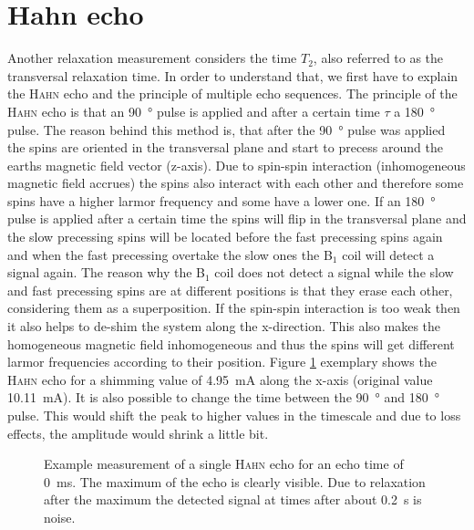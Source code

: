 \section{Hahn echo}
\label{sec:Hahnecho}
Another relaxation measurement considers the time $T_2$, also referred to as the transversal relaxation time.
In order to understand that, we first have to explain the \textsc{Hahn} echo and the principle of multiple echo sequences.\newline
The principle of the \textsc{Hahn} echo is that an \SI{90}{\degree} pulse is applied and after a certain time $\tau$ a \SI{180}{\degree} pulse.
The reason behind this method is, that after the \SI{90}{\degree} pulse was applied the spins are oriented in the transversal plane and start to precess around the earths magnetic field vector (z-axis).
Due to spin-spin interaction (inhomogeneous magnetic field accrues) the spins also interact with each other and therefore some spins have a higher larmor frequency and some have a lower one.
If an \SI{180}{\degree} pulse is applied after a certain time the spins will flip in the transversal plane and the slow precessing spins will be located before the fast precessing spins again and when the fast precessing  overtake the slow ones the B$_1$ coil will detect a signal again.
The reason why the B$_1$ coil does not detect a signal while the slow and fast precessing spins are at different positions is that they erase each other, considering them as a superposition.
If the spin-spin interaction is too weak then it also helps to de-shim the system along the x-direction.
This also makes the homogeneous magnetic field inhomogeneous and thus the spins will get different larmor frequencies according to their position.\newline
Figure \ref{fig:Echobeispeilsignal} exemplary shows the \textsc{Hahn} echo for a shimming value of \SI{4.95}{\milli \ampere} along the x-axis (original value \SI{10.11}{\milli \ampere}).
It is also possible to change the time between the \SI{90}{\degree} and \SI{180}{\degree} pulse.
This would shift the peak to higher values in the timescale and due to loss effects, the amplitude would shrink a little bit.
\begin{figure}[H]
    \centering
    
    \caption[Example measurement of a single \textsc{Hahn} echo for an echo time of \SI{0}{\milli \second}.]{Example measurement of a single \textsc{Hahn} echo for an echo time of \SI{0}{\milli \second}.
    The maximum of the echo is clearly visible.
    Due to relaxation after the maximum the detected signal at times after about \SI{0.2}{\second} is noise.}
    \label{fig:Echobeispeilsignal}
\end{figure}
